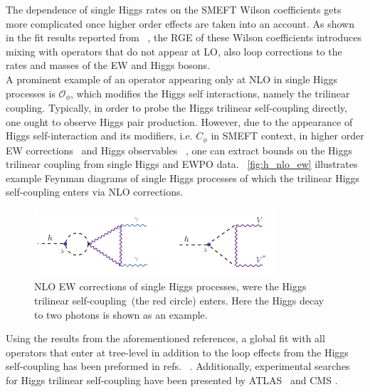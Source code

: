 The dependence of single Higgs rates on the SMEFT Wilson coefficients gets more complicated once higher order effects are taken into an account. As shown in the fit results reported from ~\cite{Dawson:2020oco}, the RGE of these Wilson coefficients introduces mixing with operators that do not appear at LO, also loop corrections to the rates and masses of the EW and Higgs bosons. \\A prominent example of an operator appearing only at NLO in single Higgs processes is $\mathcal O_\phi$, which modifies the Higgs self interactions, namely the trilinear coupling. 
Typically, in order to probe the Higgs trilinear self-coupling directly, one ought to observe Higgs pair production. However, due to the appearance of Higgs self-interaction and its modifiers, i.e. $C_\phi$ in SMEFT context, in higher order EW corrections~\cite{Degrassi:2014sxa,Kribs:2017znd} and Higgs observables~ \cite{McCullough:2013rea, Gorbahn:2016uoy, Degrassi:2016wml, Bizon:2016wgr, Maltoni:2017ims, Degrassi:2019yix, Degrassi:2021uik, Haisch:2021hvy}, one can extract bounds on the Higgs trilinear coupling from single Higgs and EWPO data. ~\autoref{fig:h_nlo_ew} illustrates  example Feynman diagrams of single Higgs processes of which the trilinear Higgs self-coupling enters via NLO corrections.
\begin{figure}[htpb!]
	\begin{center}
		\includegraphics[width=0.8\textwidth]{figures/htoaa_nlo_ew}
		\caption{NLO EW corrections of single Higgs processes,  were the Higgs trilinear self-coupling~(the red circle) enters. Here the Higgs decay to two photons is shown as an example. \label{fig:h_nlo_ew} }
	\end{center}
\end{figure}
Using the results from the aforementioned references, a global fit with all operators that enter at tree-level in addition to the loop effects from the Higgs self-coupling has been preformed in refs.~ \cite{DiVita:2017eyz,Dawson:2020oco}. Additionally, experimental searches for Higgs trilinear self-coupling have been presented by ATLAS~\cite{ATLAS:2019pbo} and CMS \cite{CMS:2020gsy}. 
